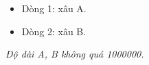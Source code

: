 \begin{itemize}
	\item Dòng 1: xâu A.
	\item Dòng 2: xâu B.
\end{itemize}

\emph{Độ dài A, B không quá 1000000. }